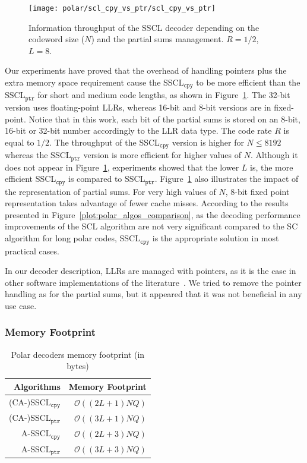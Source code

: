 \begin{figure}
  \centering
  \texttt{[image: polar/scl\_cpy\_vs\_ptr/scl\_cpy\_vs\_ptr]}
  \caption{Information throughput of the SSCL decoder depending on the codeword
    size ($N$) and the partial sums management. $R = 1 / 2$, $L = 8$.}
  \label{plot:polar_scl_cpy_vs_ptr}
\end{figure}

Our experiments have proved that the overhead of handling pointers plus the
extra memory space requirement cause the SSCL$_{\texttt{cpy}}$ to be more
efficient than the SSCL$_{\texttt{ptr}}$ for short and medium code lengths, as
shown in Figure~\ref{plot:polar_scl_cpy_vs_ptr}. The 32-bit version uses
floating-point LLRs, whereas 16-bit and 8-bit versions are in fixed-point.
Notice that in this work, each bit of the partial sums is stored on an 8-bit,
16-bit or 32-bit number accordingly to the LLR data type. The code rate $R$ is
equal to $1/2$. The throughput of the SSCL$_{\texttt{cpy}}$ version is higher
for $N \leq 8192$ whereas the SSCL$_{\texttt{ptr}}$ version is more efficient
for higher values of $N$. Although it does not appear in
Figure~\ref{plot:polar_scl_cpy_vs_ptr}, experiments showed that the lower $L$
is, the more efficient SSCL$_{\texttt{cpy}}$ is compared to
SSCL$_{\texttt{ptr}}$. Figure~\ref{plot:polar_scl_cpy_vs_ptr} also illustrates
the impact of the representation of partial sums. For very high values of $N$,
8-bit fixed point representation takes advantage of fewer cache misses.
According to the results presented in Figure~\ref{plot:polar_algos_comparison},
as the decoding performance improvements of the SCL algorithm are not very
significant compared to the SC algorithm for long polar codes,
SSCL$_{\texttt{cpy}}$ is the appropriate solution in most practical cases.

In our decoder description, LLRs are managed with pointers, as it is the case in
other software implementations of the
literature~\cite{Sarkis2014b,Sarkis2016,Shen2016}. We tried to remove the
pointer handling as for the partial sums, but it appeared that it was not
beneficial in any use case.

\subsubsection{Memory Footprint}

\begin{table}
  \centering
  \caption{Polar decoders memory footprint (in bytes)}
  \label{tab:polar_scl_memory_footprint}
   \begin{tabular}{r r}
    \textbf{Algorithms}        & \textbf{Memory Footprint} \\
    \hline
    \hline
    (CA-)SSCL$_{\texttt{cpy}}$ & $\mathcal{O}((2L + 1)NQ)$ \\
    (CA-)SSCL$_{\texttt{ptr}}$ & $\mathcal{O}((3L + 1)NQ)$ \\
    A-SSCL$_{\texttt{cpy}}$    & $\mathcal{O}((2L + 3)NQ)$ \\
    A-SSCL$_{\texttt{ptr}}$    & $\mathcal{O}((3L + 3)NQ)$ \\
  \end{tabular}
\end{table}

